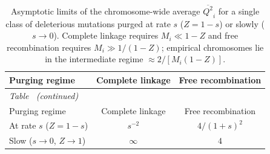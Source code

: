 \documentclass{article}
\begin{document}
\begingroup
\setlength{\LTcapwidth}{\textwidth}
\begin{longtable}{lcc}
\caption{Asymptotic limits of the chromosome-wide average $\overline{Q^2}_i$ for a single class of deleterious mutations purged at rate $s$ ($Z = 1 - s$) or slowly ($s \to 0$). Complete linkage requires $M_i \ll 1 - Z$ and free recombination requires $M_i \gg 1/(1-Z)$; empirical chromosomes lie in the intermediate regime $\approx 2/[M_i(1-Z)]$.}\label{tab:linked_limits}\\
\toprule
Purging regime & Complete linkage & Free recombination \\
\midrule
\endfirsthead
\multicolumn{3}{l}{\textit{Table~\thetable{} (continued)}}\\
\toprule
Purging regime & Complete linkage & Free recombination \\
\midrule
\endhead
\bottomrule
\endlastfoot
At rate $s$ ($Z = 1 - s$) & $s^{-2}$ & $4/(1 + s)^2$ \\
Slow ($s \to 0$, $Z \to 1$) & $\infty$ & $4$ \\
\end{longtable}
\endgroup

\ifdefined\isMainDocument
\else
    \printbibliography
    
\end{document}
